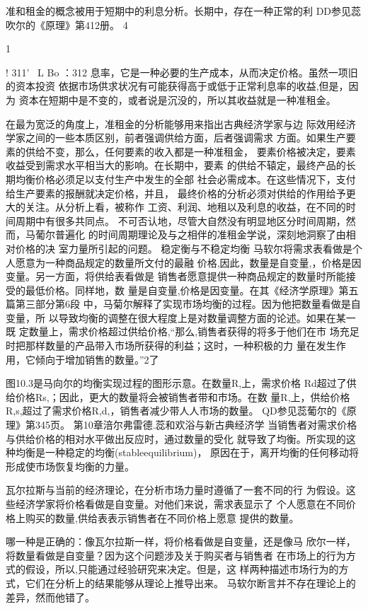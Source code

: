 准和租金的概念被用于短期中的利息分析。长期中，存在一种正常的利
DD参见蕊吹尔的《原理》第412册。
4

1

!
311'
~L
Bo
：312
息率，它是一种必要的生产成本，从而决定价格。虽然一项旧的资本投资
依据市场供求状况有可能获得高于或低于正常利息率的收益,但是，因为
资本在短期中是不变的，或者说是沉没的，所以其收益就是一种准租金。

在最为宽泛的角度上，准租金的分析能够用来指出古典经济学家与边
际效用经济学家之间的一些本质区别，前者强调供给方面，后者强调需求
方面。如果生产要素的供给不变，那么，任何要素的收入都是一种准租金，
要素价格被决定，要素收益受到需求水平相当大的影响。在长期中，要素
的供给不辕定，最终产品的长期均衡价格必须足以支付生产中发生的全部
社会必需成本。在这些情况下，支付给生产要素的报酬就决定价格，并且，
最终价格的分析必须对供给的作用给予更大的关注。从分析上看，被称作
工资、利润、地租以及利息的收益，在不同的时间周期中有很多共同点。
不可否认地，尽管大自然没有明显地区分时间周期，然而，马葡尔普遍化
的时间周期理论及与之相伴的准租金学说，深刻地洞察了由相对价格的决
室力量所引起的问题。
稳定衡与不稳定均衡
马软尔将需求表看做是个人愿意为一种商品规定的数量所文付的最融
价格,因此，数量是自变量,，价格是因变量。另一方面，将供给表看做是
销售者愿意提供一种商品规定的数量时所能接受的最低价格。同样地，数
量是自变量,价格是因变量。在其《经济学原理》第五篇第三部分第6段
中，马菊尔解释了实现市场均衡的过程。因为他把数量看做是自变量，所
以导致均衡的调整在很大程度上是对数量调整方面的论述。如果在某一既
定数量上，需求价格超过供给价格,“那么,销售者获得的将多于他们在市
场充足时把那样数量的产品带入市场所获得的利益；这时，一种积极的力
量在发生作用，它倾向于增加销售的数量。”2了

图10.3是马向尔的均衡实现过程的图形示意。在数量R,上，需求价格
Rd超过了供给价格Rs,；因此，更大的数量将会被销售者带和市场。在数
量R,上，供给价格R,s,超过了需求价格R,d,，销售者减少带人人市场的数量。
QD参见蕊葡尔的《原理》第345页。
第10章涪尔弗雷德.蕊和欢浴与新古典经济学
当销售者对需求价格与供给价格的相对水平做出反应时，通过数量的受化
就导致了均衡。所实现的这种均衡是一种稳定的均衡(stableequilibrium)，
原因在于，离开均衡的任何移动将形成使市场恢复均衡的力量。

瓦尔拉斯与当前的经济理论，在分析市场力量时遵循了一套不同的行
为假设。这些经济学家将价格看做是自变量。对他们来说，需求表显示了
个人愿意在不同价格上购买的数量,供给表表示销售者在不同价格上愿意
提供的数量。

哪一种是正确的：像瓦尔拉斯一样，将价格看做是自变量，还是像马
欣尔一样，将数量看做是自变量？因为这个问题涉及关于购买者与销售者
在市场上的行为方式的假设，所以,只能通过经验研究来决定。但是，这
样两种描述市场行为的方式，它们在分析上的结果能够从理论上推导出来。
马软尔断言并不存在理论上的差异，然而他错了。

